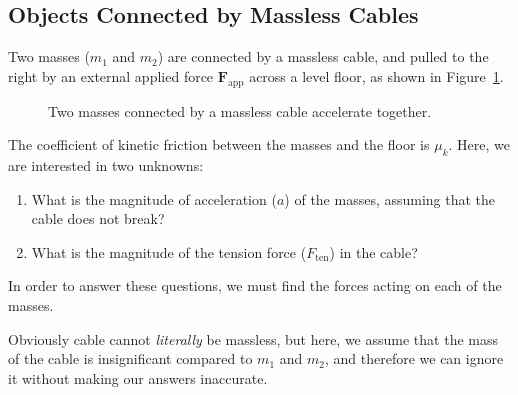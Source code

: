 \subsection{Objects Connected by Massless Cables}
Two masses ($m_1$ and $m_2$) are connected by a massless cable, and pulled to
the right by an external applied force $\bm F_\text{app}$ across a level floor,
as shown in Figure~\ref{fig:multibody1-tension}.
\begin{figure}[ht]
  \centering
  \caption{Two masses connected by a massless cable accelerate together.}
  \label{fig:multibody1-tension}
\end{figure}
The coefficient of kinetic friction between the masses and the floor is
$\mu_k$. Here, we are interested in two unknowns:
\begin{enumerate}[itemsep=6pt]
\item What is the magnitude of acceleration ($a$) of the masses, assuming that
  the cable does not break?
\item What is the magnitude of the tension force ($F_\text{ten}$) in the cable?
\end{enumerate}
In order to answer these questions, we must find the forces acting on each of
the masses.
\begin{remark}
  Obviously cable cannot \emph{literally} be massless, but here, we assume
  that the mass of the cable is insignificant compared to $m_1$ and $m_2$, and
  therefore we can ignore it without making our answers inaccurate.
\end{remark}

